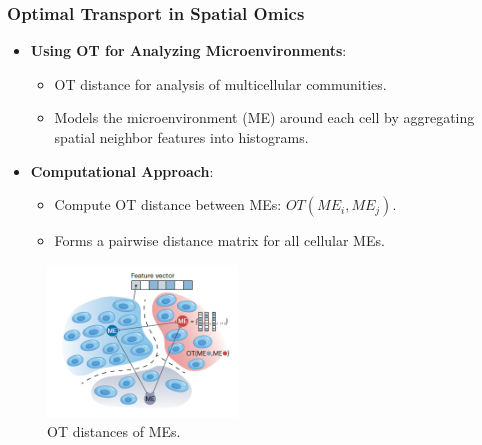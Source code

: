 \documentclass{beamer}
\begin{document}
		\begin{frame}
			\frametitle{Optimal Transport in Spatial Omics}
			\begin{itemize}
				\item \textbf{Using OT for Analyzing Microenvironments}:
					\begin{itemize}
						\item OT distance for analysis of multicellular communities.
						\item Models the microenvironment (ME) around each cell by aggregating spatial neighbor features into histograms.
					\end{itemize}
					
					\item \textbf{Computational Approach}:
					\begin{itemize}
						\item Compute OT distance between MEs: \(OT(ME_i, ME_j)\).
						\item Forms a pairwise distance matrix for all cellular MEs.
					\end{itemize}
				\end{itemize}
				\begin{figure}
					\includegraphics[width=0.45\textwidth]{spatial1.png}
					\caption{OT distances of MEs. \cite{bunne2024optimal}}
				\end{figure}
			\end{frame}
			
\end{document}
